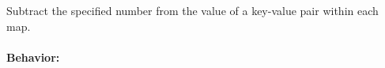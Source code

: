 Subtract the specified number from the value of a key-value pair within each
map.

\paragraph{Behavior:}
\begin{itemize}[noitemsep]



\end{itemize}
